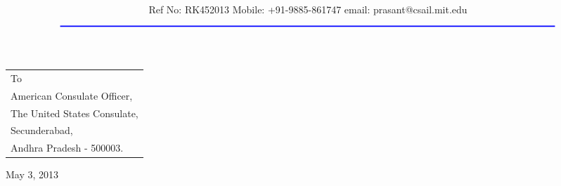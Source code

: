 \documentclass[11pt,A4]{article}
\title{\vspace*{-1.5cm} \centerline{ {\Huge{ \bf \hspace{0cm}{\color{blue} R K Engineering Services}}\vspace*{-0.75cm}}}}
\author{\centerline {\color{blue}{39-24-18/1, Madhavadhara, I E Post, Visakhapatnam - 7}}\\ \\
 \footnotesize {\color{blue}Ref No: RK452013  \hspace*{3cm}   Mobile: +91-9885-861747  \hspace*{3cm} email: prasant@csail.mit.edu}\\
${\color{blue}\rule{7.0in}{0.5mm}}$}
\date{}
\begin{document}
\maketitle
\thispagestyle{empty}
\vspace*{0.35cm}	
\begin{flushleft}
{
\noindent \begin{tabular}{l}
\noindent To\\
\noindent American Consulate Officer,\\
\noindent The United States Consulate,\\
\noindent Secunderabad, \\
\noindent Andhra Pradesh - 500003.  
\end{tabular}
}
\end{flushleft}
\vspace*{-2cm}
\begin{flushright} May 3, 2013 \end{flushright} 
\end{document}
